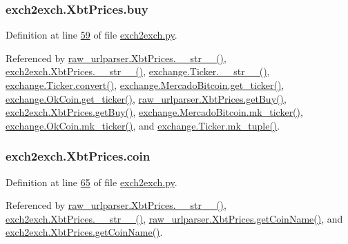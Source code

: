 \subsubsection[{\texorpdfstring{buy}{buy}}]{\setlength{\rightskip}{0pt plus 5cm}exch2exch.\+Xbt\+Prices.\+buy}\hypertarget{classexch2exch_1_1_xbt_prices_a8f1d8ac0ef114ea3645314578697b7ac}{}\label{classexch2exch_1_1_xbt_prices_a8f1d8ac0ef114ea3645314578697b7ac}


Definition at line \hyperlink{exch2exch_8py_source_l00059}{59} of file \hyperlink{exch2exch_8py_source}{exch2exch.\+py}.



Referenced by \hyperlink{raw__urlparser_8py_source_l00074}{raw\+\_\+urlparser.\+Xbt\+Prices.\+\_\+\+\_\+str\+\_\+\+\_\+()}, \hyperlink{exch2exch_8py_source_l00091}{exch2exch.\+Xbt\+Prices.\+\_\+\+\_\+str\+\_\+\+\_\+()}, \hyperlink{exchange_8py_source_l00099}{exchange.\+Ticker.\+\_\+\+\_\+str\+\_\+\+\_\+()}, \hyperlink{exchange_8py_source_l00055}{exchange.\+Ticker.\+convert()}, \hyperlink{exchange_8py_source_l00306}{exchange.\+Mercado\+Bitcoin.\+get\+\_\+ticker()}, \hyperlink{exchange_8py_source_l00371}{exchange.\+Ok\+Coin.\+get\+\_\+ticker()}, \hyperlink{raw__urlparser_8py_source_l00062}{raw\+\_\+urlparser.\+Xbt\+Prices.\+get\+Buy()}, \hyperlink{exch2exch_8py_source_l00070}{exch2exch.\+Xbt\+Prices.\+get\+Buy()}, \hyperlink{exchange_8py_source_l00320}{exchange.\+Mercado\+Bitcoin.\+mk\+\_\+ticker()}, \hyperlink{exchange_8py_source_l00385}{exchange.\+Ok\+Coin.\+mk\+\_\+ticker()}, and \hyperlink{exchange_8py_source_l00084}{exchange.\+Ticker.\+mk\+\_\+tuple()}.

\subsubsection[{\texorpdfstring{coin}{coin}}]{\setlength{\rightskip}{0pt plus 5cm}exch2exch.\+Xbt\+Prices.\+coin}\hypertarget{classexch2exch_1_1_xbt_prices_a1191c8825e8f1333b4100b89fa2be053}{}\label{classexch2exch_1_1_xbt_prices_a1191c8825e8f1333b4100b89fa2be053}


Definition at line \hyperlink{exch2exch_8py_source_l00065}{65} of file \hyperlink{exch2exch_8py_source}{exch2exch.\+py}.



Referenced by \hyperlink{raw__urlparser_8py_source_l00074}{raw\+\_\+urlparser.\+Xbt\+Prices.\+\_\+\+\_\+str\+\_\+\+\_\+()}, \hyperlink{exch2exch_8py_source_l00091}{exch2exch.\+Xbt\+Prices.\+\_\+\+\_\+str\+\_\+\+\_\+()}, \hyperlink{raw__urlparser_8py_source_l00071}{raw\+\_\+urlparser.\+Xbt\+Prices.\+get\+Coin\+Name()}, and \hyperlink{exch2exch_8py_source_l00088}{exch2exch.\+Xbt\+Prices.\+get\+Coin\+Name()}.

